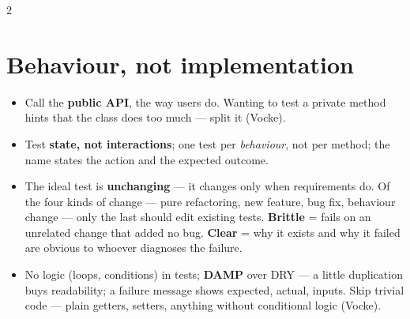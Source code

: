 \documentclass[8pt]{extarticle}
\begin{document}
\begin{multicols}{2}
\section{Behaviour, not implementation}
\begin{itemize}
  \item Call the \textbf{public API}, the way users do. Wanting to test a private method hints
        that the class does too much — split it (Vocke).
  \item Test \textbf{state, not interactions}; one test per \emph{behaviour}, not per method;
        the name states the action and the expected outcome.
  \item The ideal test is \textbf{unchanging} — it changes only when requirements do. Of the
        four kinds of change — pure refactoring, new feature, bug fix, behaviour change — only
        the last should edit existing tests. \textbf{Brittle} = fails on an unrelated change
        that added no bug. \textbf{Clear} = why it exists and why it failed are obvious to
        whoever diagnoses the failure.
  \item No logic (loops, conditions) in tests; \textbf{DAMP} over DRY — a little duplication
        buys readability; a failure message shows expected, actual, inputs. Skip trivial code —
        plain getters, setters, anything without conditional logic (Vocke).
\end{itemize}

\end{multicols}

\end{document}
